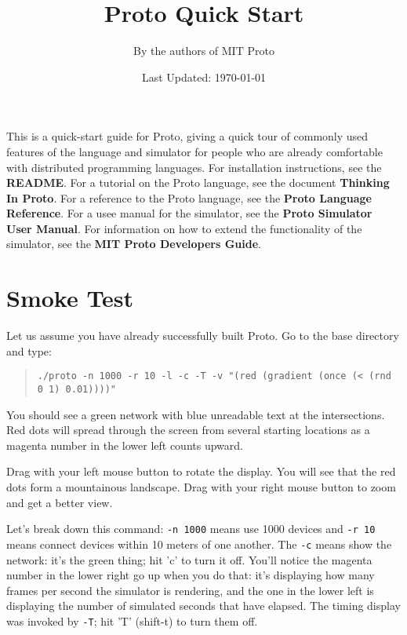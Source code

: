 \documentclass{article}
\title{Proto Quick Start}
\author{By the authors of MIT Proto}
\date{Last Updated: \today}
\newcommand\code[1]{\begin{quote}\var{#1}\end{quote}}
\newcommand\var[1]{{\tt #1}}
\begin{document}
\maketitle

This is a quick-start guide for Proto, giving a quick tour of commonly
used features of the language and simulator for people who are already
comfortable with distributed programming languages.  For installation
instructions, see the {\bf README}.  For a tutorial on the Proto
language, see the document {\bf Thinking In Proto}.  For a reference
to the Proto language, see the {\bf Proto Language Reference}.  For a
usee manual for the simulator, see the {\bf Proto Simulator User
  Manual}.  For information on how to extend the functionality of the
simulator, see the {\bf MIT Proto Developers Guide}.



\section{Smoke Test}

Let us assume you have already successfully built Proto.
Go to the base directory and type:
\code{./proto -n 1000 -r 10 -l -c -T -v "(red (gradient (once (< (rnd
  0 1) 0.01))))"}
You should see a green network with blue unreadable text at the
intersections.  Red dots will spread through the screen from
several starting locations as a magenta number in the lower
left counts upward.

Drag with your left mouse button to rotate the display.  You will see
that the red dots form a mountainous landscape.  Drag with your right
mouse button to zoom and get a better view.

Let's break down this command: \var{-n 1000} means use 1000 devices
and \var{-r 10} means connect devices within 10 meters of one another.
The \var{-c} means show the network: it's the green thing; hit 'c' to
turn it off.  You'll notice the magenta number in the lower right go
up when you do that: it's displaying how many frames per second the
simulator is rendering, and the one in the lower left is displaying
the number of simulated seconds that have elapsed.  The timing display
was invoked by \var{-T}; hit 'T' (shift-t) to turn them off.
\end{document}
